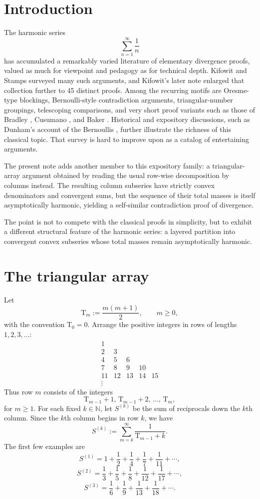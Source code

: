 \documentclass{article}
\theoremstyle{theorem}
\theoremstyle{definition}
\newcommand{\N}{\mathbb{N}}
\newcommand{\T}{\mathrm{T}}
\begin{document}
\section{Introduction}

The harmonic series
\[
\sum_{n=1}^{\infty}\frac1n
\]
has accumulated a remarkably varied literature of elementary divergence proofs, valued as much for viewpoint and pedagogy as for technical depth. Kifowit and Stamps \cite{KifowitStamps2006} surveyed many such arguments, and Kifowit's later note \cite{Kifowit2019} enlarged that collection further to 45 distinct proofs. Among the recurring motifs are Oresme-type blockings, Bernoulli-style contradiction arguments, triangular-number groupings, telescoping comparisons, and very short proof variants such as those of Bradley \cite{Bradley2000}, Cusumano \cite{Cusumano1998, Cusumano2012}, and Baker \cite{Baker2015}. Historical and expository discussions, such as Dunham’s account of the Bernoullis \cite{Dunham1987}, further illustrate the richness of this classical topic. That survey is hard to improve upon as a catalog of entertaining arguments.

The present note adds another member to this expository family: a triangular-array argument obtained by reading the usual row-wise decomposition by columns instead. The resulting column subseries have strictly convex denominators and convergent sums, but the sequence of their total masses is itself asymptotically harmonic, yielding a self-similar contradiction proof of divergence.

The point is not to compete with the classical proofs in simplicity, but to exhibit a different structural feature of the harmonic series: a layered partition into convergent convex subseries whose total masses remain asymptotically harmonic.

\section{The triangular array}

Let
\[
\T_m := \frac{m(m+1)}{2}, \qquad m \ge 0,
\]
with the convention $\T_0=0$. Arrange the positive integers in rows of lengths $1,2,3,\dots$:
\[
\begin{matrix}
1\\[2pt]
2 & 3\\[2pt]
4 & 5 & 6\\[2pt]
7 & 8 & 9 & 10\\[2pt]
11 & 12 & 13 & 14 & 15\\[2pt]
\vdots
\end{matrix}
\]
Thus row $m$ consists of the integers
\[
\T_{m-1}+1,\, \T_{m-1}+2,\, \dots,\, \T_m,
\]
for $m \ge 1$. For each fixed $k \in \N$, let $S^{(k)}$ be the sum of reciprocals down the $k$th column. Since the $k$th column begins in row $k$, we have
\begin{equation}\label{eq:Sk-def}
S^{(k)} := \sum_{m=k}^{\infty} \frac{1}{\T_{m-1}+k}.
\end{equation}
The first few examples are
\[
S^{(1)} = 1 + \frac12 + \frac14 + \frac17 + \frac1{11} + \cdots,
\]
\[
S^{(2)} = \frac13 + \frac15 + \frac18 + \frac1{12} + \frac1{17} + \cdots,
\]
\[
S^{(3)} = \frac16 + \frac19 + \frac1{13} + \frac1{18} + \cdots.
\]
\end{document}
